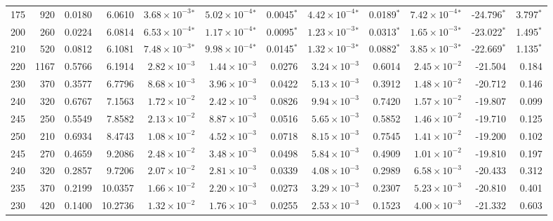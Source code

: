 \begin{landscape}
\begin{footnotesize}
\begin{longtable}{r r r r r r r r r r r r}
175 & 920 & 0.0180 & 6.0610 & \(3.68\!\times\!10^{-3}\)$^*$ & \(5.02\!\times\!10^{-4}\)$^*$ & 0.0045$^*$ & \(4.42\!\times\!10^{-4}\)$^*$ & 0.0189$^*$ & \(7.42\!\times\!10^{-4}\)$^*$ & -24.796$^*$ & 3.797$^*$ \\
200 & 260 & 0.0224 & 6.0814 & \(6.53\!\times\!10^{-4}\)$^*$ & \(1.17\!\times\!10^{-4}\)$^*$ & 0.0095$^*$ & \(1.23\!\times\!10^{-3}\)$^*$ & 0.0313$^*$ & \(1.65\!\times\!10^{-3}\)$^*$ & -23.022$^*$ & 1.495$^*$ \\
210 & 520 & 0.0812 & 6.1081 & \(7.48\!\times\!10^{-3}\)$^*$ & \(9.98\!\times\!10^{-4}\)$^*$ & 0.0145$^*$ & \(1.32\!\times\!10^{-3}\)$^*$ & 0.0882$^*$ & \(3.85\!\times\!10^{-3}\)$^*$ & -22.669$^*$ & 1.135$^*$ \\
220 & 1167 & 0.5766 & 6.1914 & \(2.82\!\times\!10^{-3}\) & \(1.44\!\times\!10^{-3}\) & 0.0276 & \(3.24\!\times\!10^{-3}\) & 0.6014 & \(2.45\!\times\!10^{-2}\) & -21.504 & 0.184 \\
230 & 370 & 0.3577 & 6.7796 & \(8.68\!\times\!10^{-3}\) & \(3.96\!\times\!10^{-3}\) & 0.0422 & \(5.13\!\times\!10^{-3}\) & 0.3912 & \(1.48\!\times\!10^{-2}\) & -20.712 & 0.146 \\
240 & 320 & 0.6767 & 7.1563 & \(1.72\!\times\!10^{-2}\) & \(2.42\!\times\!10^{-3}\) & 0.0826 & \(9.94\!\times\!10^{-3}\) & 0.7420 & \(1.57\!\times\!10^{-2}\) & -19.807 & 0.099 \\
245 & 250 & 0.5549 & 7.8582 & \(2.13\!\times\!10^{-2}\) & \(8.87\!\times\!10^{-3}\) & 0.0516 & \(5.65\!\times\!10^{-3}\) & 0.5852 & \(1.46\!\times\!10^{-2}\) & -19.710 & 0.125 \\
250 & 210 & 0.6934 & 8.4743 & \(1.08\!\times\!10^{-2}\) & \(4.52\!\times\!10^{-3}\) & 0.0718 & \(8.15\!\times\!10^{-3}\) & 0.7545 & \(1.41\!\times\!10^{-2}\) & -19.200 & 0.102 \\
245 & 270 & 0.4659 & 9.2086 & \(2.48\!\times\!10^{-2}\) & \(3.48\!\times\!10^{-3}\) & 0.0498 & \(5.84\!\times\!10^{-3}\) & 0.4909 & \(1.01\!\times\!10^{-2}\) & -19.810 & 0.197 \\
240 & 320 & 0.2857 & 9.7206 & \(2.07\!\times\!10^{-2}\) & \(2.81\!\times\!10^{-3}\) & 0.0339 & \(4.08\!\times\!10^{-3}\) & 0.2989 & \(6.58\!\times\!10^{-3}\) & -20.433 & 0.312 \\
235 & 370 & 0.2199 & 10.0357 & \(1.66\!\times\!10^{-2}\) & \(2.20\!\times\!10^{-3}\) & 0.0273 & \(3.29\!\times\!10^{-3}\) & 0.2307 & \(5.23\!\times\!10^{-3}\) & -20.810 & 0.401 \\
230 & 420 & 0.1400 & 10.2736 & \(1.32\!\times\!10^{-2}\) & \(1.76\!\times\!10^{-3}\) & 0.0255 & \(2.53\!\times\!10^{-3}\) & 0.1523 & \(4.00\!\times\!10^{-3}\) & -21.332 & 0.603 \\

\end{longtable}
\end{footnotesize}
\end{landscape}
